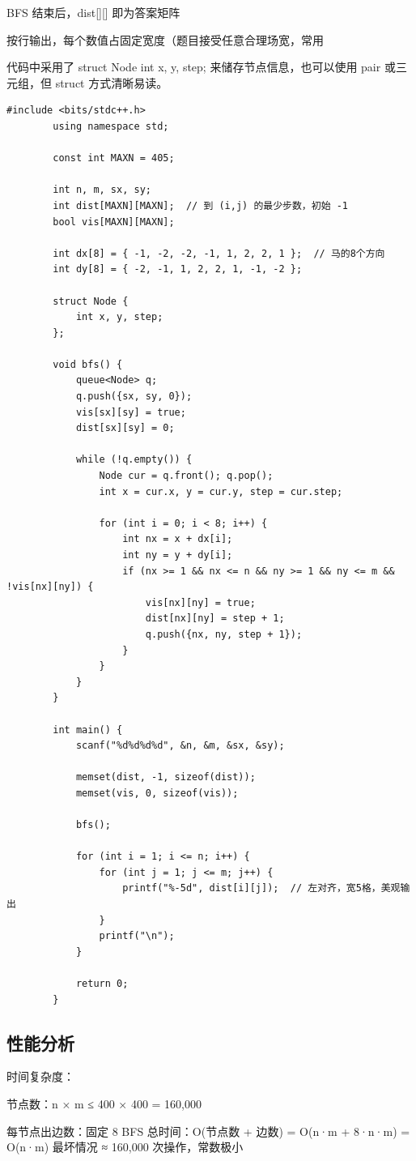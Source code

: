 \documentclass[supercite]{Experimental_Report}
\theoremstyle{definition}
\begin{document}
	BFS 结束后，dist[][] 即为答案矩阵
	
	按行输出，每个数值占固定宽度（题目接受任意合理场宽，常用 %
	
	代码中采用了 struct Node {int x, y, step;} 来储存节点信息，也可以使用 pair 或三元组，但 struct 方式清晰易读。
	
	\begin{lstlisting}[style=commonCodeStyle, caption={P1443.cpp}, label={lst:4-1}]
		#include <bits/stdc++.h>
		using namespace std;
		
		const int MAXN = 405;
		
		int n, m, sx, sy;
		int dist[MAXN][MAXN];  // 到 (i,j) 的最少步数，初始 -1
		bool vis[MAXN][MAXN];
		
		int dx[8] = { -1, -2, -2, -1, 1, 2, 2, 1 };  // 马的8个方向
		int dy[8] = { -2, -1, 1, 2, 2, 1, -1, -2 };
		
		struct Node {
			int x, y, step;
		};
		
		void bfs() {
			queue<Node> q;
			q.push({sx, sy, 0});
			vis[sx][sy] = true;
			dist[sx][sy] = 0;
			
			while (!q.empty()) {
				Node cur = q.front(); q.pop();
				int x = cur.x, y = cur.y, step = cur.step;
				
				for (int i = 0; i < 8; i++) {
					int nx = x + dx[i];
					int ny = y + dy[i];
					if (nx >= 1 && nx <= n && ny >= 1 && ny <= m && !vis[nx][ny]) {
						vis[nx][ny] = true;
						dist[nx][ny] = step + 1;
						q.push({nx, ny, step + 1});
					}
				}
			}
		}
		
		int main() {
			scanf("%d%d%d%d", &n, &m, &sx, &sy);
			
			memset(dist, -1, sizeof(dist));
			memset(vis, 0, sizeof(vis));
			
			bfs();
			
			for (int i = 1; i <= n; i++) {
				for (int j = 1; j <= m; j++) {
					printf("%-5d", dist[i][j]);  // 左对齐，宽5格，美观输出
				}
				printf("\n");
			}
			
			return 0;
		}
	\end{lstlisting}
	
	\subsection{性能分析}
	时间复杂度：
	
	节点数：n × m ≤ 400 × 400 = 160,000
	
	每节点出边数：固定 8
	BFS 总时间：O(节点数 + 边数) = O(n·m + 8·n·m) = O(n·m)
	最坏情况 ≈ 160,000 次操作，常数极小
	
\end{document}
